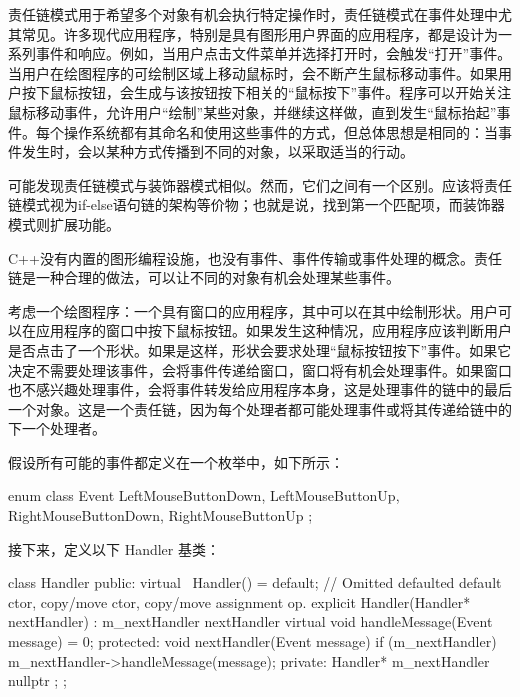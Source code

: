 
责任链模式用于希望多个对象有机会执行特定操作时，责任链模式在事件处理中尤其常见。许多现代应用程序，特别是具有图形用户界面的应用程序，都是设计为一系列事件和响应。例如，当用户点击文件菜单并选择打开时，会触发“打开”事件。当用户在绘图程序的可绘制区域上移动鼠标时，会不断产生鼠标移动事件。如果用户按下鼠标按钮，会生成与该按钮按下相关的“鼠标按下”事件。程序可以开始关注鼠标移动事件，允许用户“绘制”某些对象，并继续这样做，直到发生“鼠标抬起”事件。每个操作系统都有其命名和使用这些事件的方式，但总体思想是相同的：当事件发生时，会以某种方式传播到不同的对象，以采取适当的行动。

可能发现责任链模式与装饰器模式相似。然而，它们之间有一个区别。应该将责任链模式视为if-else语句链的架构等价物；也就是说，找到第一个匹配项，而装饰器模式则扩展功能。

C++没有内置的图形编程设施，也没有事件、事件传输或事件处理的概念。责任链是一种合理的做法，可以让不同的对象有机会处理某些事件。


考虑一个绘图程序：一个具有窗口的应用程序，其中可以在其中绘制形状。用户可以在应用程序的窗口中按下鼠标按钮。如果发生这种情况，应用程序应该判断用户是否点击了一个形状。如果是这样，形状会要求处理“鼠标按钮按下”事件。如果它决定不需要处理该事件，会将事件传递给窗口，窗口将有机会处理事件。如果窗口也不感兴趣处理事件，会将事件转发给应用程序本身，这是处理事件的链中的最后一个对象。这是一个责任链，因为每个处理者都可能处理事件或将其传递给链中的下一个处理者。


假设所有可能的事件都定义在一个枚举中，如下所示：

\begin{cpp}
enum class Event { LeftMouseButtonDown, LeftMouseButtonUp,
    RightMouseButtonDown, RightMouseButtonUp };
\end{cpp}

接下来，定义以下 Handler 基类：

\begin{cpp}
class Handler
{
    public:
        virtual ~Handler() = default;
        // Omitted defaulted default ctor, copy/move ctor, copy/move assignment op.
        explicit Handler(Handler* nextHandler) : m_nextHandler { nextHandler } { }
        virtual void handleMessage(Event message) = 0;
    protected:
        void nextHandler(Event message)
        {
            if (m_nextHandler) { m_nextHandler->handleMessage(message); }
        }
    private:
        Handler* m_nextHandler { nullptr };
};
\end{cpp}

